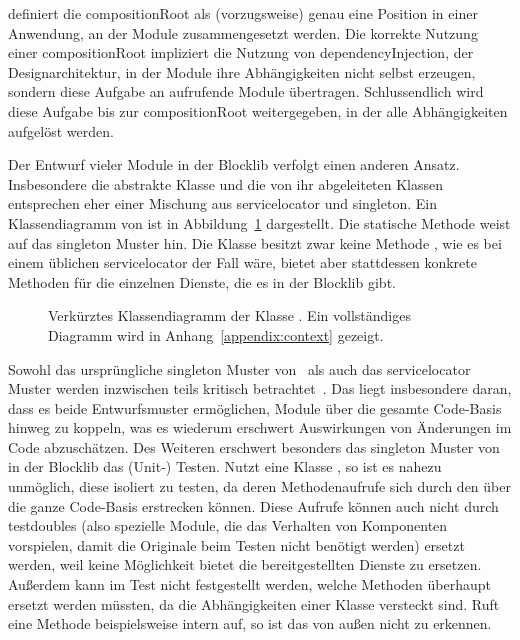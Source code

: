 \textcite[S.~76]{Seemann2012} definiert die \gls{compositionRoot} als (vorzugsweise) genau eine Position in einer Anwendung, an der Module zusammengesetzt werden. Die korrekte Nutzung einer \gls{compositionRoot} impliziert die Nutzung von \gls{dependencyInjection}, der Designarchitektur, in der Module ihre Abhängigkeiten nicht selbst erzeugen, sondern diese Aufgabe an aufrufende Module übertragen. Schlussendlich wird diese Aufgabe bis zur \gls{compositionRoot} weitergegeben, in der alle Abhängigkeiten aufgelöst werden. 


Der Entwurf vieler Module in der Blocklib verfolgt einen anderen Ansatz. Insbesondere die abstrakte Klasse \classContext{} und die von ihr abgeleiteten Klassen entsprechen eher einer Mischung aus \gls{servicelocator} und \gls{singleton}. Ein Klassendiagramm von \classContext{} ist in Abbildung~\ref{fig:diagContext} dargestellt. Die statische Methode  weist auf das \gls{singleton} Muster hin. Die Klasse besitzt zwar keine Methode , wie es bei einem üblichen \gls{servicelocator} der Fall wäre, bietet aber stattdessen konkrete Methoden für die einzelnen Dienste, die es in der Blocklib gibt.

\begin{figure}
  \begin{center}
    
  \end{center}
  \caption[Verkürztes Klassendiagramm der Klasse \classContext{}.]{Verkürztes Klassendiagramm der Klasse \classContext{}. Ein vollständiges Diagramm wird in Anhang~\vref{appendix:context} gezeigt.}\label{fig:diagContext}
\end{figure}

Sowohl das ursprüngliche \gls{singleton} Muster von~\textcite[S.~127~ff.]{Gamma2016} als auch das \gls{servicelocator} Muster werden inzwischen teils kritisch betrachtet~\cite[S.~103~ff.]{Nystrom2015}\cite[S.~154~ff.]{Seemann2012}. Das liegt insbesondere daran, dass es beide Entwurfsmuster ermöglichen, Module über die gesamte Code-Basis hinweg zu koppeln, was es wiederum erschwert Auswirkungen von Änderungen im Code abzuschätzen. Des Weiteren erschwert besonders das \gls{singleton} Muster von \classContext{} in der Blocklib das (Unit-) Testen. Nutzt eine Klasse \classContext{}, so ist es nahezu unmöglich, diese isoliert zu testen, da deren Methodenaufrufe sich durch den \classContext{} über die ganze Code-Basis erstrecken können. Diese  Aufrufe können auch nicht durch \glspl{testdouble} (also spezielle Module, die das Verhalten von Komponenten vorspielen, damit die Originale beim Testen nicht benötigt werden) ersetzt werden, weil \classContext{} keine Möglichkeit bietet die bereitgestellten Dienste zu ersetzen. Außerdem kann im Test nicht festgestellt werden, welche Methoden überhaupt ersetzt werden müssten, da die Abhängigkeiten einer Klasse versteckt sind. Ruft eine Methode beispielsweise intern  auf, so ist das von außen nicht zu erkennen.

